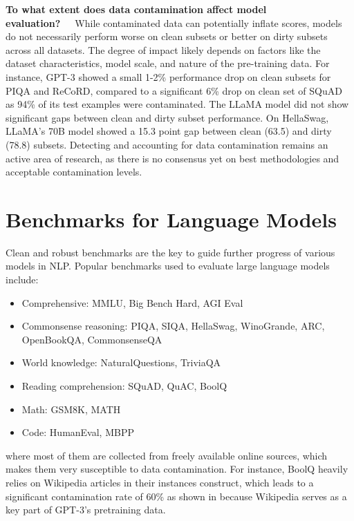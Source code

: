 \documentclass[letterpaper]{article} %
\begin{document}
\noindent\textbf{To what extent does data contamination affect model evaluation?}~~~While contaminated data can potentially inflate scores, models do not necessarily perform worse on clean subsets or better on dirty subsets across all datasets. The degree of impact likely depends on factors like the dataset characteristics, model scale, and nature of the pre-training data. For instance, GPT-3 \cite{brown2020language} showed a small 1-2\% performance drop on clean subsets for PIQA and ReCoRD, compared to a significant 6\% drop on clean set of SQuAD as 94\% of its test examples were contaminated. The LLaMA model \cite{touvron2023llama} did not show significant gaps between clean and dirty subset performance. On HellaSwag, LLaMA's 70B model showed a 15.3 point gap between clean (63.5) and dirty (78.8) subsets. Detecting and accounting for data contamination remains an active area of research, as there is no consensus yet on best methodologies and acceptable contamination levels.

\section{Benchmarks for Language Models}

Clean and robust benchmarks are the key to guide further progress of various models in NLP.
Popular benchmarks used to evaluate large language models include:
\begin{itemize}
    \item Comprehensive: MMLU, Big Bench Hard, AGI Eval
    \item Commonsense reasoning: PIQA, SIQA, HellaSwag, WinoGrande, ARC, OpenBookQA, CommonsenseQA
    \item World knowledge: NaturalQuestions, TriviaQA
    \item Reading comprehension: SQuAD, QuAC, BoolQ
    \item Math: GSM8K, MATH
    \item Code: HumanEval, MBPP
\end{itemize}
where most of them are collected from freely available online sources, which makes them very susceptible to data contamination. For instance, BoolQ \cite{clark2019boolq} heavily relies on Wikipedia articles in their instances construct, which leads to a significant contamination rate of 60\% as shown in \cite{brown2020language} because Wikipedia serves as a key part of GPT-3's pretraining data.
\end{document}
